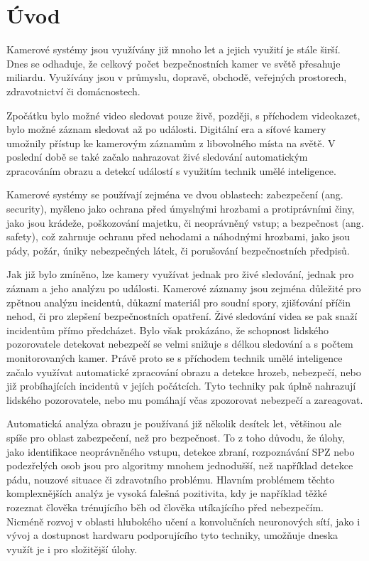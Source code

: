 \chapter{Úvod}
\label{sec:Introduction}

Kamerové systémy jsou využívány již mnoho let a jejich využití je stále širší.
Dnes se odhaduje, že celkový počet bezpečnostních kamer ve světě přesahuje
miliardu. Využívány jsou v průmyslu, dopravě, obchodě, veřejných prostorech,
zdravotnictví či domácnostech.

Zpočátku bylo možné video sledovat pouze živě, později, s příchodem videokazet,
bylo možné záznam sledovat až po události. Digitální era a síťové kamery
umožnily přístup ke kamerovým záznamům z libovolného místa na světě. V poslední
době se také začalo nahrazovat živé sledování automatickým zpracováním obrazu a
detekcí událostí s využitím technik umělé inteligence.

Kamerové systémy se používají zejména ve dvou oblastech: zabezpečení (ang.
security), myšleno jako ochrana před úmyslnými hrozbami a protiprávními činy,
jako jsou krádeže, poškozování majetku, či neoprávněný vstup; a bezpečnost
(ang. safety), což zahrnuje ochranu před nehodami a náhodnými hrozbami, jako
jsou pády, požár, úniky nebezpečných látek, či porušování bezpečnostních
předpisů.

Jak již bylo zmíněno, lze kamery využívat jednak pro živé sledování, jednak pro
záznam a jeho analýzu po události. Kamerové záznamy jsou zejména důležité pro
zpětnou analýzu incidentů, důkazní materiál pro soudní spory, zjišťování příčin
nehod, či pro zlepšení bezpečnostních opatření. Živé sledování videa se pak
snaží incidentům přímo předcházet. Bylo však prokázáno, že schopnost lidského
pozorovatele detekovat nebezpečí se velmi snižuje s délkou sledování a s počtem
monitorovaných kamer. Právě proto se s příchodem technik umělé inteligence
začalo využívat automatické zpracování obrazu a detekce hrozeb, nebezpečí, nebo
již probíhajících incidentů v jejích počátcích. Tyto techniky pak úplně
nahrazují lidského pozorovatele, nebo mu pomáhají včas zpozorovat nebezpečí a
zareagovat.

Automatická analýza obrazu je používaná již několik desítek let, většinou ale
spíše pro oblast zabezpečení, než pro bezpečnost. To z toho důvodu, že úlohy,
jako identifikace neoprávněného vstupu, detekce zbraní, rozpoznávání SPZ nebo
podezřelých osob jsou pro algoritmy mnohem jednodušší, než například detekce
pádu, nouzové situace či zdravotního problému. Hlavním problémem těchto
komplexnějších analýz je vysoká falešná pozitivita, kdy je například těžké
rozeznat člověka trénujícího běh od člověka utíkajícího před nebezpečím.
Nicméně rozvoj v oblasti hlubokého učení a konvolučních neuronových sítí, jako
i vývoj a dostupnost hardwaru podporujícího tyto techniky, umožňuje dneska využít
je i pro složitější úlohy.

